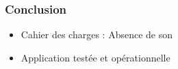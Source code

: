  \begin{frame}
   \frametitle{Conclusion}
 \begin{itemize}
    \item Cahier des charges : Absence de son
    \item Application testée et opérationnelle
   \end{itemize}
\end{frame}